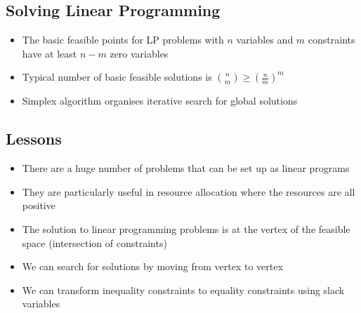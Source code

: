 
\begin{slide}
\section[-2]{Solving Linear Programming}

\pb\pause {}
\begin{minipage}{0.5\linewidth}
\begin{center}
  \pause
\end{center}  
\end{minipage}\hfil
\begin{minipage}{0.45\linewidth}
  \begin{itemize}
  \item The basic feasible points for LP problems with $n$ variables and
    $m$ constraints have at least $n-m$ zero variables\pause
  \item Typical number of basic feasible solutions is
    $\binom{n}{m}\geq\left(\frac{n}{m}\right)^m$\pause
  \item Simplex algorithm organises iterative search for global solutions\pause
  \end{itemize}
\end{minipage}

\end{slide}




\begin{slide}
\section{Lessons}
 
\begin{PauseHighLight}
  \begin{itemize}
  \item There are a huge number of problems that can be set up as linear
    programs\pause
  \item They are particularly useful in resource allocation where the
    resources are all positive\pause
  \item The solution to linear programming problems is at the vertex of
    the feasible space (intersection of constraints)\pause
  \item We can search for solutions by moving from vertex to vertex\pause
  \item We can transform inequality constraints to equality constraints
    using slack variables\pause
  \end{itemize}
\end{PauseHighLight}

\end{slide}


